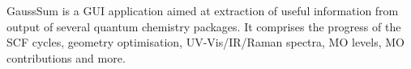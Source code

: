 GaussSum is a GUI application aimed at extraction of useful information from output of several quantum chemistry packages. It comprises the progress of the SCF cycles, geometry optimisation, UV-Vis/IR/Raman spectra, MO levels, MO contributions and more.